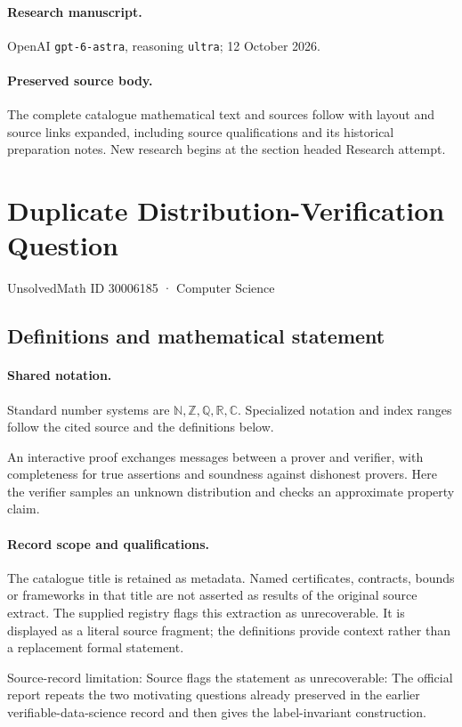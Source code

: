 \documentclass[11pt]{article}
\begin{document}
\paragraph{Research manuscript.} OpenAI \texttt{gpt-6-astra}, reasoning \texttt{ultra}; 12 October 2026.
\paragraph{Preserved source body.} The complete catalogue mathematical text and sources follow with layout and source links expanded, including source qualifications and its historical preparation notes. New research begins at the section headed Research attempt.

\section{Duplicate Distribution-Verification Question}\label{30006185}
{\small UnsolvedMath ID 30006185 · Computer Science}
\subsection{Definitions and mathematical statement}

\paragraph{Shared notation.}Standard number systems are $\mathbb N,\mathbb Z,\mathbb Q,\mathbb R,\mathbb C$. Specialized notation and index ranges follow the cited source and the definitions below.


An interactive proof exchanges messages between a prover and verifier, with completeness for true assertions and soundness against dishonest provers. Here the verifier samples an unknown distribution and checks an approximate property claim.
\paragraph{Record scope and qualifications.}
The catalogue title is retained as metadata. Named certificates, contracts, bounds or frameworks in that title are not asserted as results of the original source extract.
The supplied registry flags this extraction as unrecoverable. It is displayed as a literal source fragment; the definitions provide context rather than a replacement formal statement.

Source-record limitation: Source flags the statement as unrecoverable: The official report repeats the two motivating questions already preserved in the earlier verifiable-data-science record and then gives the label-invariant construction.
\end{document}
